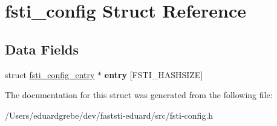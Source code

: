 \hypertarget{structfsti__config}{}\section{fsti\+\_\+config Struct Reference}
\label{structfsti__config}
\subsection*{Data Fields}
\begin{DoxyCompactItemize}
\item 
\mbox{\label{structfsti__config_a81f93171eff88117abb294a1a168c245}} 
struct \mbox{\hyperlink{structfsti__config__entry}{fsti\+\_\+config\+\_\+entry}} $\ast$ {\bfseries entry} \mbox{[}F\+S\+T\+I\+\_\+\+H\+A\+S\+H\+S\+I\+ZE\mbox{]}
\end{DoxyCompactItemize}


The documentation for this struct was generated from the following file\+:\begin{DoxyCompactItemize}
\item 
/\+Users/eduardgrebe/dev/faststi-\/eduard/src/fsti-\/config.\+h\end{DoxyCompactItemize}
